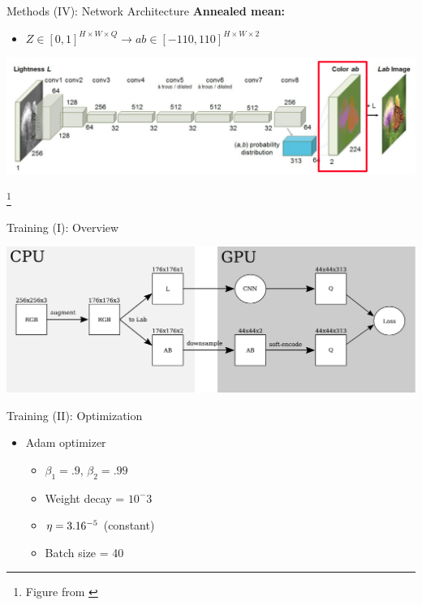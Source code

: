 \documentclass{beamer}
\newcommand\blfootnote[1]{%
  \begingroup
  \renewcommand\thefootnote{}\footnote{#1}%
  \addtocounter{footnote}{-1}%
  \endgroup
}
\begin{document}
\begin{frame}{Methods (IV): Network Architecture}
  \textbf{Annealed mean:}
    \begin{itemize}
      \item $Z \in [0, 1]^{H \times W \times Q} \rightarrow ab \in [-110,110]^{H \times W \times 2}$
    \end{itemize}

  \medskip

  \includegraphics[width=\linewidth]{resources/network4.jpg}

  \blfootnote{Figure from \cite{Zhang2016}}
\end{frame}


\begin{frame}{Training (I): Overview}
  \begin{center}
    \includegraphics[width=\textwidth]{resources/training.pdf}
  \end{center}
\end{frame}

\begin{frame}{Training (II): Optimization}
  \begin{itemize}
    \item Adam optimizer
       \begin{itemize}
         \item $\beta_1 = .9$, $\beta_2 = .99$
         \item Weight decay = $10^-3$
         \item $\eta = 3.16 \time 10^{-5}$ (constant)
         \item Batch size = 40
       \end{itemize}
  \end{itemize}
\end{frame}
\end{document}
